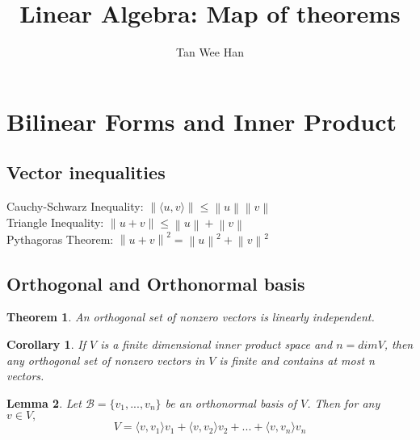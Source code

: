 \documentclass{article}
\newcommand{\norm}[1]{\left\lVert#1\right\rVert}
\newcommand{\innerproduct}[1]{\langle#1\rangle}
\newtheorem{theorem}{Theorem}[section]
\newtheorem{corollary}{Corollary}[theorem]
\newtheorem{lemma}[theorem]{Lemma}
\numberwithin{theorem}{subsection} %
\numberwithin{definition}{subsection} %
\numberwithin{proposition}{subsection} %
\begin{document}
\title{\Large{\textbf{Linear Algebra: Map of theorems}}}
\author{Tan Wee Han}
\maketitle

\let\cleardoublepage\clearpage
\tableofcontents

\pagestyle{plain} %

\makeatletter
\makeatother


\section{Bilinear Forms and Inner Product}


\subsection{Vector inequalities}
Cauchy-Schwarz Inequality: $\norm{\innerproduct{u,v}} \leq \norm{u}\norm{v}$ \\
Triangle Inequality: $\norm{u+v} \leq \norm{u} + \norm{v}$ \\
Pythagoras Theorem: $\norm{u+v}^2 = \norm{u}^2 + \norm{v}^2$ \bigskip

\subsection{Orthogonal and Orthonormal basis}
\begin{theorem}
    An orthogonal set of nonzero vectors is linearly independent.
\end{theorem}

\begin{corollary}
    If $V$ is a finite dimensional inner product space and $n=dim V$, then any orthogonal set of nonzero vectors in $V$ is finite and contains at most n vectors.
\end{corollary}

\begin{lemma}
    Let $ \mathcal{B} = \{v_1,...,v_n\}$ be an orthonormal basis of $V$. Then for any $v \in V,$ \\
    \begin{equation*}
        V = \innerproduct{v,v_1}v_1 + \innerproduct{v,v_2}v_2 +...+
        \innerproduct{v,v_n}v_n
    \end{equation*}
\end{lemma}
\end{document}
